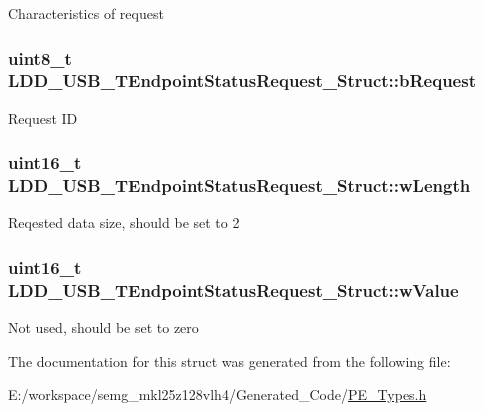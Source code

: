 Characteristics of request \hypertarget{struct_l_d_d___u_s_b___t_endpoint_status_request___struct_ae8ab1e11dae5a0b3a4b4a7256a542175}{
\subsubsection[{b\-Request}]{\setlength{\rightskip}{0pt plus 5cm}uint8\-\_\-t L\-D\-D\-\_\-\-U\-S\-B\-\_\-\-T\-Endpoint\-Status\-Request\-\_\-\-Struct\-::b\-Request}}\label{struct_l_d_d___u_s_b___t_endpoint_status_request___struct_ae8ab1e11dae5a0b3a4b4a7256a542175}
Request I\-D \hypertarget{struct_l_d_d___u_s_b___t_endpoint_status_request___struct_addba57e934f9c77c9159d7be618dd6dc}{
\subsubsection[{w\-Length}]{\setlength{\rightskip}{0pt plus 5cm}uint16\-\_\-t L\-D\-D\-\_\-\-U\-S\-B\-\_\-\-T\-Endpoint\-Status\-Request\-\_\-\-Struct\-::w\-Length}}\label{struct_l_d_d___u_s_b___t_endpoint_status_request___struct_addba57e934f9c77c9159d7be618dd6dc}
Reqested data size, should be set to 2 \hypertarget{struct_l_d_d___u_s_b___t_endpoint_status_request___struct_a987fe8c9322a22d8b5118eccd4de42c8}{
\subsubsection[{w\-Value}]{\setlength{\rightskip}{0pt plus 5cm}uint16\-\_\-t L\-D\-D\-\_\-\-U\-S\-B\-\_\-\-T\-Endpoint\-Status\-Request\-\_\-\-Struct\-::w\-Value}}\label{struct_l_d_d___u_s_b___t_endpoint_status_request___struct_a987fe8c9322a22d8b5118eccd4de42c8}
Not used, should be set to zero 

The documentation for this struct was generated from the following file\-:\begin{DoxyCompactItemize}
\item 
E\-:/workspace/semg\-\_\-mkl25z128vlh4/\-Generated\-\_\-\-Code/\hyperlink{_p_e___types_8h}{P\-E\-\_\-\-Types.\-h}\end{DoxyCompactItemize}
